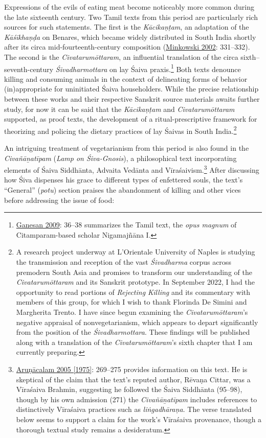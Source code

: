 Expressions of the evils of eating meat become noticeably more common during the late sixteenth century. Two Tamil texts from this period are particularly rich sources for such statements. The first is the \emph{{Kācikaṇṭam}}, an adaptation of the \emph{{Kāśīkhaṇḍa}} on Benares, which became widely distributed in South India shortly after its circa mid-fourteenth-century composition (\hyperref[Minkowski2002]{Minkowski 2002}: 331–332). The second is the \emph{{Civatarumōttaram}}, an influential translation of the circa sixth–seventh-century \emph{{Śivadharmottara}} on lay Śaiva praxis.\footnote{%
\hyperref[Ganesan2009]{Ganesan 2009}: 36–38 summarizes the Tamil text, the \emph{opus magnum} of Citamparam-based scholar Nigamajñāna I. 
}
 Both texts denounce killing and consuming animals in the context of delineating forms of behavior (in)appropriate for uninitiated Śaiva householders. While the precise relationship between these works and their respective Sanskrit source materials awaits further study, for now it can be said that the \emph{{Kācikaṇṭam}} and \emph{Civatarumōttaram} supported, as proof texts, the development of a ritual-prescriptive framework for theorizing and policing the dietary practices of lay Śaivas in South India.\footnote{%
A research project underway at L’Orientale University of Naples is studying the transmission and reception of the vast \emph{Śivadharma} corpus across premodern South Asia and promises to transform our understanding of the \emph{Civatarumōttaram} and its Sanskrit prototype. In September 2022, I had the opportunity to read portions of \emph{Rejecting Killing }and its commentary with members of this group, for which I wish to thank Florinda De Simini and Margherita Trento. I have since begun examining the \emph{{Civatarumōttaram}}’s negative appraisal of nonvegetarianism, which appears to depart significantly from the position of the \emph{Śivadharmottara}. These findings will be published along with a translation of the \emph{{Civatarumōttaram}}’s sixth chapter that I am currently preparing.
}



An intriguing treatment of vegetarianism from this period is also found in the \emph{{Civañāṉatīpam}} (\emph{Lamp on Śiva-Gnosis}), a philosophical text incorporating elements of Śaiva Siddhānta, Advaita Vedānta and Vīraśaivism.\footnote{%
\hyperref[Arunacalam2005]{Aruṇācalam 2005 [1975]}: 269–275 provides information on this text. He is skeptical of the claim that the text’s reputed author, Rēvaṇa Cittar, was a Vīraśaiva Brahmin, suggesting he followed the Śaiva Siddhānta (95–98), though by his own admission (271) the \emph{{Civañāṉatīpam}} includes references to distinctively Vīraśaiva practices such as \emph{liṅgadhāraṇa}. The verse translated below seems to support a claim for the work’s Vīraśaiva provenance, though a thorough textual study remains a desideratum. 
}
 After discussing how Śiva dispenses his grace to different types of enfettered souls, the text’s “General” (\emph{potu}) section praises the abandonment of killing and other vices before addressing the issue of food: 

